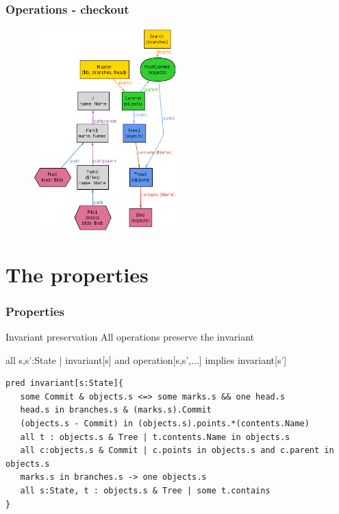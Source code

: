 \documentclass{beamer}
\begin{document}
\begin{frame}[fragile]
   \frametitle{Operations - checkout}
      \begin{figure}
         \centering
         \includegraphics[width=0.50\textwidth]{images/checkout2.png}
      \end{figure}
\end{frame}

\section{The properties}
\begin{frame}[fragile]
   \frametitle{Properties}
   \begin{block}{Invariant preservation}
      All operations preserve the invariant
   \end{block}
   \vspace{0.1in}
all s,s':State | invariant[s] and operation[s,s',...] implies invariant[s'] \\
   \vspace{0.3in}
   \tiny
   \begin{lstlisting}
pred invariant[s:State]{   
   some Commit & objects.s <=> some marks.s && one head.s
   head.s in branches.s & (marks.s).Commit
   (objects.s - Commit) in (objects.s).points.*(contents.Name)
   all t : objects.s & Tree | t.contents.Name in objects.s
   all c:objects.s & Commit | c.points in objects.s and c.parent in objects.s
   marks.s in branches.s -> one objects.s
   all s:State, t : objects.s & Tree | some t.contains
}
   \end{lstlisting}

\end{frame}
\end{document}
